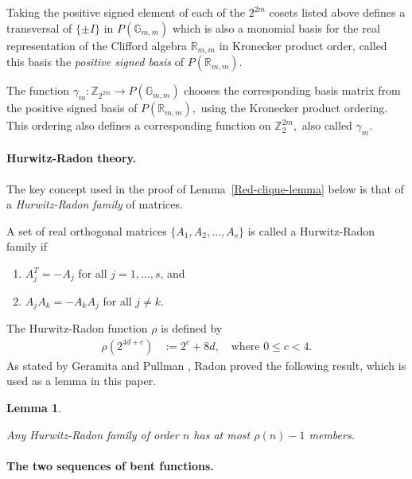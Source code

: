 \documentclass[12pt,a4paper]{article}
\newcommand{\mb}[1]{\mathbb{#1}}
\newcommand{\G}{\mb{G}}
\newcommand{\R}{\mb{R}}
\newcommand{\Z}{\mb{Z}}
\newcommand{\Rep}{P}
\newcommand{\To}{\rightarrow}
\newtheorem{Lemma}{Lemma}
\newtheorem{Definition}{Definition}
\begin{document}
Taking the positive signed element of each of the $2^{2m}$ cosets listed above
defines a transversal of $\{\pm I\}$ in $\Rep(\G_{m,m})$
which is also a monomial basis for the real representation of the Clifford algebra $\R_{m,m}$ in
Kronecker product order,
called this basis the \emph{positive signed basis} of $\Rep(\R_{m,m}).$

The function $\gamma_m : \Z_{2^{2 m}} \To \Rep(\G_{m,m})$
chooses the corresponding basis matrix from the positive signed basis of $\Rep(\R_{m,m}),$
using the Kronecker product ordering.
This ordering also defines a corresponding function on $\Z_2^{2 m},$
also called $\gamma_m.$

\paragraph*{Hurwitz-Radon theory.}
\label{sec-Hurwitz-Radon}
The key concept used in the proof of Lemma~\ref{Red-clique-lemma} below is that of a \emph{Hurwitz-Radon family} of matrices.
~

A set of real orthogonal matrices $\{A_1,A_2,\ldots,A_s\}$ is called a Hurwitz-Radon family
\cite{GerP74a,Hur22,Rad22} if
\begin{enumerate}
 \item
$A_j^T = -A_j$ for all $j=1,\ldots,s$, and
 \item
$A_j A_k = -A_k A_j$ for all $j \neq k$.
\end{enumerate}
The Hurwitz-Radon function $\rho$ is defined by
\begin{align*}
\rho(2^{4 d + c}) &:= 2^c + 8 d, \quad \text{where~} 0 \leqslant c < 4.
\end{align*}
As stated by Geramita and Pullman \cite{GerP74a}, Radon \cite{Rad22}
proved the following result, which is used as a lemma in this paper.
\begin{Lemma}\label{Hurwitz-Radon-lemma}
\cite[Theorem A]{GerP74a}

Any Hurwitz-Radon family of order $n$ has at most $\rho(n)-1$ members.
\end{Lemma}

\paragraph*{The two sequences of bent functions.}
\label{sec-Bent}

~
\end{document}
